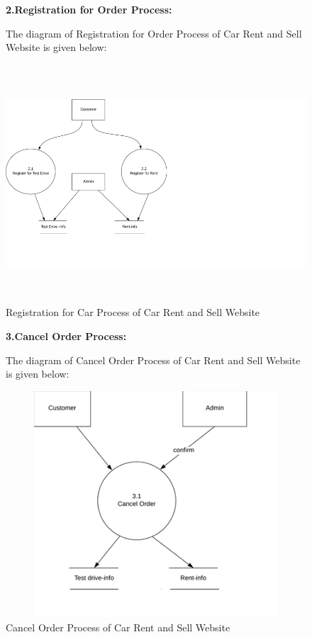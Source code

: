 \noindent 
\begin{figure}



 \textbf{2.Registration for Order Process:}


\noindent 

\noindent The diagram of Registration for Order Process of Car Rent and Sell Website is given below:

\noindent 

\noindent \includegraphics*[width=6.50in, height=3.50in, keepaspectratio=false]{figures/Registration}
\caption{Registration for Car Process of Car Rent and Sell Website}
\end{figure}
\noindent 

\noindent 

\noindent 

\noindent 

\noindent 

\noindent 
\begin{figure}


 \textbf{3.Cancel Order Process:}


\noindent 

\noindent 

\noindent The diagram of Cancel Order Process of Car Rent and Sell Website is given below:

\noindent 

\noindent \includegraphics*[width=6.50in, height=3.33in, keepaspectratio=false]{figures/Cancel}
\caption{ Cancel Order Process of Car Rent and Sell Website}
\end{figure}
\noindent 

